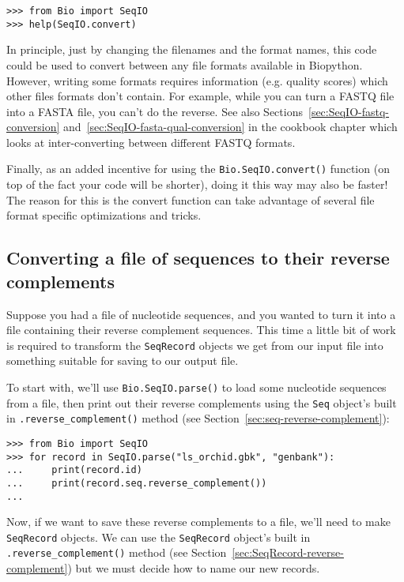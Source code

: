 \begin{verbatim}
>>> from Bio import SeqIO
>>> help(SeqIO.convert)
\end{verbatim}

In principle, just by changing the filenames and the format names, this code
could be used to convert between any file formats available in Biopython.
However, writing some formats requires information (e.g. quality scores) which
other files formats don't contain. For example, while you can turn a FASTQ
file into a FASTA file, you can't do the reverse. See also
Sections~\ref{sec:SeqIO-fastq-conversion} and~\ref{sec:SeqIO-fasta-qual-conversion}
in the cookbook chapter which looks at inter-converting between different FASTQ formats.

Finally, as an added incentive for using the \verb|Bio.SeqIO.convert()| function
(on top of the fact your code will be shorter), doing it this way may also be
faster! The reason for this is the convert function can take advantage of
several file format specific optimizations and tricks.

\subsection{Converting a file of sequences to their reverse complements}
\label{sec:SeqIO-reverse-complement}

Suppose you had a file of nucleotide sequences, and you wanted to turn it into a file containing their reverse complement sequences.  This time a little bit of work is required to transform the \verb|SeqRecord| objects we get from our input file into something suitable for saving to our output file.

To start with, we'll use \verb|Bio.SeqIO.parse()| to load some nucleotide
sequences from a file, then print out their reverse complements using
the \verb|Seq| object's built in \verb|.reverse_complement()| method (see Section~\ref{sec:seq-reverse-complement}):

\begin{verbatim}
>>> from Bio import SeqIO
>>> for record in SeqIO.parse("ls_orchid.gbk", "genbank"):
...     print(record.id)
...     print(record.seq.reverse_complement())
...
\end{verbatim}

Now, if we want to save these reverse complements to a file, we'll need to make \verb|SeqRecord| objects.
We can use  the \verb|SeqRecord| object's built in \verb|.reverse_complement()| method (see Section~\ref{sec:SeqRecord-reverse-complement}) but we must decide how to name our new records.

